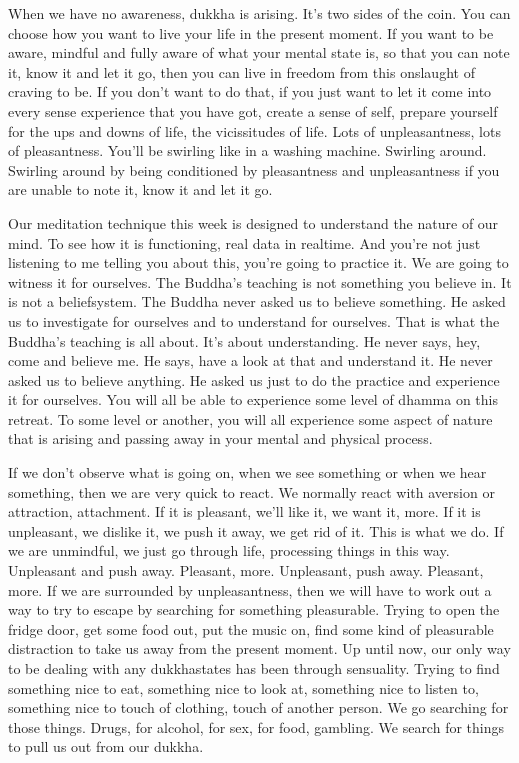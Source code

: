 \documentclass[letterpaper,10pt,english]{sphinxmanual}
\begin{document}
\sphinxAtStartPar
When we have no awareness, dukkha is arising. It’s two sides of the
coin. You can choose how you want to live your life in the present moment.
If you want to be aware, mindful and fully aware of what your mental state
is, so that you can note it, know it and let it go, then you can live in freedom
from this onslaught of craving to be. If you don’t want to do that, if you just
want to let it come into every sense experience that you have got, create a
sense of self, prepare yourself for the ups and downs of life, the vicissitudes
of life. Lots of unpleasantness, lots of pleasantness. You’ll be swirling like in
a washing machine. Swirling around. Swirling around by being conditioned
  by pleasantness and unpleasantness if you are unable to note it, know it and
let it go.

\sphinxAtStartPar
Our  meditation  technique  this  week  is  designed  to  understand  the
nature of our mind. To see how it is functioning, real data in real\sphinxhyphen{}time. And
you’re not just listening to me telling you about this, you’re going to practice  it. We  are  going  to  witness  it  for  ourselves. The  Buddha’s  teaching  is
not something you believe in. It is not a belief\sphinxhyphen{}system. The Buddha never
asked us to believe something. He asked us to investigate for ourselves and
to understand for ourselves. That is what the Buddha’s teaching is all about.
It’s about understanding. He never says, hey, come and believe me. He says,
have a look at that and understand it. He never asked us to believe anything.
He asked us just to do the practice and experience it for ourselves. You will
all be able to experience some level of dhamma on this retreat. To some level
or another, you will all experience some aspect of nature that is arising and
passing away in your mental and physical process.

\sphinxAtStartPar
If we don’t observe what is going on, when we see something or when
we hear something, then we are very quick to react. We normally react with
aversion  or  attraction,  attachment.  If  it  is  pleasant,  we’ll  like  it,  we  want
it, more. If it is unpleasant, we dislike it, we push it away, we get rid of it.
This is what we do. If we are unmindful, we just go through life, processing
things in this way. Unpleasant and push away. Pleasant, more. Unpleasant,
push away. Pleasant, more. If we are surrounded by unpleasantness, then we
will have to work out a way to try to escape by searching for something pleasurable. Trying to open the fridge door, get some food out, put the music on,
find some kind of pleasurable distraction to take us away from the present
moment. Up until now, our only way to be dealing with any dukkha\sphinxhyphen{}states
has been through sensuality. Trying to find something nice to eat, something
nice to look at, something nice to listen to, something nice to touch of clothing, touch of another person. We go searching for those things. Drugs, for
alcohol, for sex, for food, gambling. We search for things to pull us out from
our dukkha.
\end{document}
